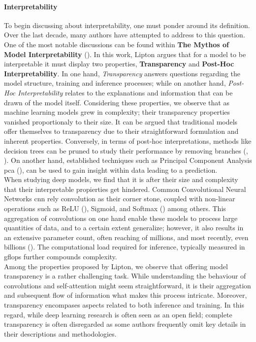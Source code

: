 \paragraph{Interpretability}
To begin discussing about interpretability, one must ponder around its definition. 
Over the last decade, many authors have attempted to address to this question. One 
of the most notable discussions can be found within \textbf{The Mythos of Model Interpretability} 
(\cite{mythos_interp}). In this work, Lipton argues that for a model to be interpretable it must display 
two properties, \textbf{Transparency} and \textbf{Post-Hoc Interpretability}. In one hand, 
\textit{Transparency} answers questions regarding the model structure, training and inference 
processes; while on another hand, \textit{Post-Hoc Interpretability} relates to the explanations 
and information that can be drawn of the model itself.
\noindent Considering these properties, we observe that as machine learning models grew in complexity; 
their transparency properties vanished  
proportionaly to their size. It can be argued that traditional models offer themselves to  
transparency due to their straightforward formulation and inherent properties. Conversely, 
in terms of post-hoc interpretations, methods like decision trees \cite{breiman2017classification} 
can be pruned to study their performance by removing branches (\cite{lakkaraju2016interpretable},
\cite{mothilal2020explaining}). 
On another hand, established techniques such as Principal Component Analysis \gls{pca} 
(\cite{wold1987principal}), can be used to gain insight within data leading to a prediction.\\

\noindent When studying deep models, we find that it is after their size and complexity that their 
interpretable propierties get hindered. Common Convolutional Neural Networks \gls{cnn} 
rely convolution as their corner stone, coupled with non-linear operations such as 
ReLU (\cite{fukushima1975cognitron}), Sigmoid, and Softmax (\cite{hopfield1985neural}) among others.
This aggregation of convolutions on one hand enable these models to process large quantities of 
data, and to a certain extent generalize; however, it also results in an extensive parameter count,
often reaching of millions, and most recently, even billions (\cite{openai_compute}). The 
computational load required for inference, typically measured in \gls{gflops} further compounds 
complexity.\\

\noindent Among the properties proposed by Lipton, we observe that offering model transparency is a 
rather challenging task. While understanding the behaviour of convolutions and 
self-attention might seem straightforward, it is their aggregation and subsequent flow of information what 
makes this process intricate. Moreover, transparency encompases aspects related to both
inference and training. In this regard, while deep learning research is often seen as an open field;
complete transparency is often disregarded as some authors frequently omit key details in their 
descriptions and methodologies. 

